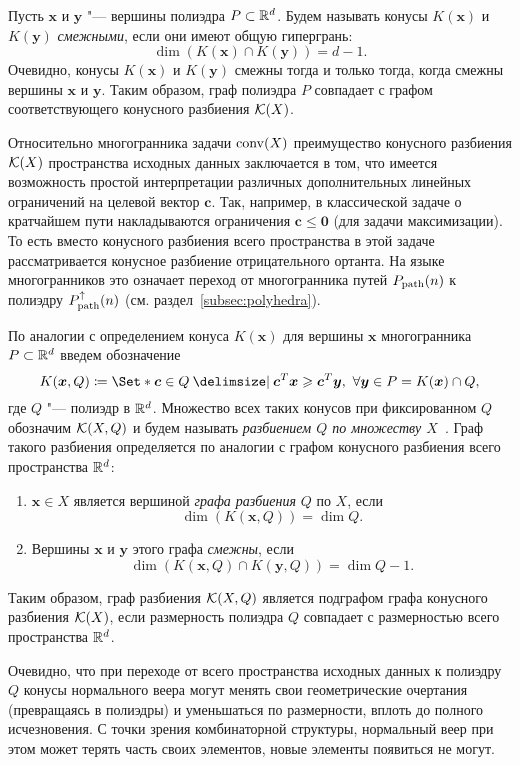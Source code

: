 Пусть $\bm{x}$ и $\bm{y}$ "--- вершины полиэдра $P \subset \mathbb{R}^d$.
Будем называть конусы $K(\bm{x})$ и $K(\bm{y})$ \emph{смежными}, если они имеют общую гипергрань:\label{AdjCones}
\[
\dim (K(\bm{x}) \cap K(\bm{y})) = d-1.
\]
Очевидно, конусы $K(\bm{x})$ и $K(\bm{y})$ смежны тогда и только тогда, когда смежны вершины $\bm{x}$ и $\bm{y}$.
Таким образом, граф полиэдра $P$ совпадает с графом соответствующего конусного разбиения ${\mathcal K}(X)$.

Относительно многогранника задачи $\operatorname{conv}(X)$ преимущество конусного разбиения ${\mathcal K}(X)$ пространства исходных данных заключается в том, что имеется возможность простой интерпретации различных дополнительных линейных ограничений на целевой вектор $\bm{c}$.
Так, например, в классической задаче о кратчайшем пути накладываются ограничения $\bm{c} \le \bm{0}$ (для задачи максимизации).
То есть вместо конусного разбиения всего пространства в этой задаче рассматривается конусное разбиение отрицательного ортанта.
На языке многогранников это означает переход от многогранника путей $P_{\textup{path}}(n)$ к полиэдру $P_{\textup{path}}^{\uparrow}(n)$ (см. раздел~\ref{subsec:polyhedra}).

По аналогии с определением конуса $K(\bm{x})$ для вершины $\bm{x}$ многогранника $P\subset \mathbb{R}^d$ введем обозначение
\[
K(\bm{x}, Q) \coloneqq \Set*{\bm{c}\in Q \given  \bm{c}^T \bm{x} \ge \bm{c}^T \bm{y}, \ \forall \bm{y} \in P} = K(\bm{x}) \cap Q, 
\]
где $Q$ "--- полиэдр в $\mathbb{R}^d$.
Множество всех таких конусов при фиксированном $Q$ обозначим ${\mathcal K}(X,Q)$ и будем называть \emph{разбиением $Q$ по множеству $X$}~\cite{Maksimenko:2004}.
Граф такого разбиения определяется по аналогии с графом конусного разбиения всего пространства $\mathbb{R}^d$:
\begin{enumerate}
	\item $\bm{x} \in X$ является вершиной \emph{графа разбиения} $Q$ по $X$, если \[\dim (K(\bm{x}, Q)) = \dim Q.\]
	\item Вершины $\bm{x}$ и $\bm{y}$ этого графа \emph{смежны}, если 
	\[\dim (K(\bm{x}, Q) \cap K(\bm{y}, Q)) = \dim Q - 1.\]
\end{enumerate}
Таким образом, граф разбиения ${\mathcal K}(X,Q)$ является подграфом графа конусного разбиения ${\mathcal K}(X)$, если размерность полиэдра $Q$ совпадает с размерностью всего пространства $\mathbb{R}^d$.

Очевидно, что при переходе от всего пространства исходных данных к полиэдру $Q$ конусы нормального веера могут менять свои геометрические очертания (превращаясь в полиэдры) и уменьшаться по размерности, вплоть до полного исчезновения. С точки зрения комбинаторной структуры, нормальный веер при этом может терять часть своих элементов, новые элементы появиться не могут.


